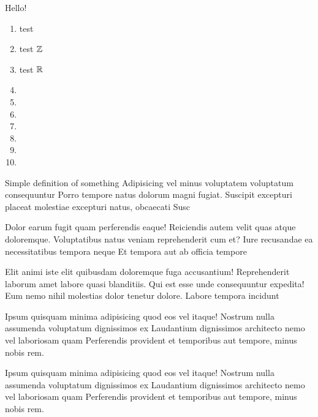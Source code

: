 \documentclass{article}
\begin{document}
    \maketitle[fullpage]
    Hello!
    \begin{enumerate}[label=\listALPHP]
        \item test \nsN{}
        \item test \(\mathbb{Z}{}\)
        \item test \(\mathbb{R}{}\)
        \item {}
        \item {}    
        \item {}
        \item {}
        \item {}  
        \item {} 
        \item {} 
    \end{enumerate}
    \begin{definition}
        Simple definition of something Adipisicing vel minus voluptatem voluptatum consequuntur Porro tempore natus dolorum magni fugiat. Suscipit excepturi placeat molestiae excepturi natus, obcaecati Susc
    \end{definition}
    \begin{theorem}
        Dolor earum fugit quam perferendis eaque! Reiciendis autem velit quas atque doloremque. Voluptatibus natus veniam reprehenderit cum et? Iure recusandae ea necessitatibus tempora neque Et tempora aut ab officia tempore
    \end{theorem}
    \begin{lemma}
        Elit animi iste elit quibusdam doloremque fuga accusantium! Reprehenderit laborum amet labore quasi blanditiis. Qui est esse unde consequuntur expedita! Eum nemo nihil molestias dolor tenetur dolore. Labore tempora incidunt
    \end{lemma}
    \begin{corollary}
        Ipsum quisquam minima adipisicing quod eos vel itaque! Nostrum nulla assumenda voluptatum dignissimos ex Laudantium dignissimos architecto nemo vel laboriosam quam Perferendis provident et temporibus aut tempore, minus nobis rem.
    \end{corollary}
    \begin{proposition}
        Ipsum quisquam minima adipisicing quod eos vel itaque! Nostrum nulla assumenda voluptatum dignissimos ex Laudantium dignissimos architecto nemo vel laboriosam quam Perferendis provident et temporibus aut tempore, minus nobis rem.
    \end{proposition}
\end{document}
